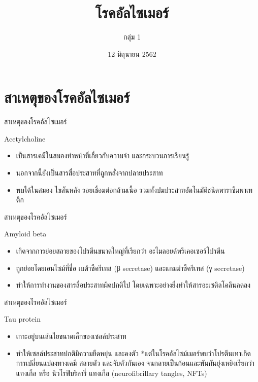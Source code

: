 \documentclass[xetex,serif]{beamer}
\title{โรคอัลไซเมอร์}
\author{กลุ่ม 1}
\date{12 มิถุนายน 2562}
\institute{ห้อง 39}
\begin{document}
\begin{frame}
  \maketitle
\end{frame}

\section{สาเหตุของโรคอัลไซเมอร์}

\begin{frame}{สาเหตุของโรคอัลไซเมอร์}

  {\large Acetylcholine}

  \begin{itemize}
    \item เป็นสารเคมีในสมองทำหน้าที่เกี่ยวกับความจำ และกระบวนการเรียนรู้
    \item นอกจากนี้ยังเป็นสารสื่อประสาทที่ถูกหลั่งจากปลายประสาท
    \item พบได้ในสมอง ไขสันหลัง รอยเชื่อมต่อกล้ามเนื้อ รวมทั้งปมประสาทอัตโนมัติชนิดพาราซิมพาเทติก
  \end{itemize}
\end{frame}

\begin{frame}{สาเหตุของโรคอัลไซเมอร์}

  {\large Amyloid beta}

  \begin{itemize}
    \item เกิดจากการย่อยสลายของโปรตีนขนาดใหญ่ที่เรียกว่า อะไมลอยด์พรีเคอเซอร์โปรตีน
    \item ถูกย่อยโดยเอนไซม์ที่ชื่อ เบต้าซีครีเทส (β secretase) และแกมม่าซีครีเทส (γ secretase)
    \item ทำให้การทำงานของสารสื่อประสาทผิดปกติไป โดยเฉพาะอย่างยิ่งทำให้สารอะเซติลโคลีนลดลง  
  \end{itemize}
\end{frame}

\begin{frame}{สาเหตุของโรคอัลไซเมอร์}

  {\large Tau protein}

  \begin{itemize}
    \item เกาะอยู่บนเส้นใยขนาดเล็กของเซลล์ประสาท
    \item ทำให้เซลล์ประสาทปกติมีความยืดหยุ่น และคงตัว *แต่ในโรคอัลไซม์เมอร์พบว่าโปรตีนเทาเกิดการเปลี่ยนแปลงทางเคมี สลายตัว และจับตัวกันเอง จนกลายเป็นก้อนและพันกันยุ่งเหยิงเรียกว่า แทงเกิ้ล หรือ นิวโรฟิบริลารี่ แทงเกิ้ล (neurofibrillary tangles, NFTs) 
  \end{itemize}
\end{frame}
\end{document}
